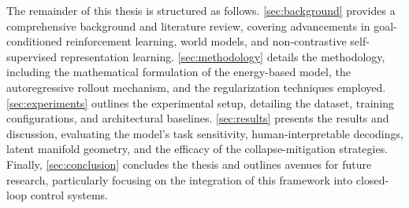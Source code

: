 The remainder of this thesis is structured as follows. \cref{sec:background} provides a comprehensive background and literature review, covering advancements in goal-conditioned reinforcement learning, world models, and non-contrastive self-supervised representation learning. \cref{sec:methodology} details the methodology, including the mathematical formulation of the energy-based model, the autoregressive rollout mechanism, and the regularization techniques employed. \cref{sec:experiments} outlines the experimental setup, detailing the dataset, training configurations, and architectural baselines. \cref{sec:results} presents the results and discussion, evaluating the model's task sensitivity, human-interpretable decodings, latent manifold geometry, and the efficacy of the collapse-mitigation strategies. Finally, \cref{sec:conclusion} concludes the thesis and outlines avenues for future research, particularly focusing on the integration of this framework into closed-loop control systems.
